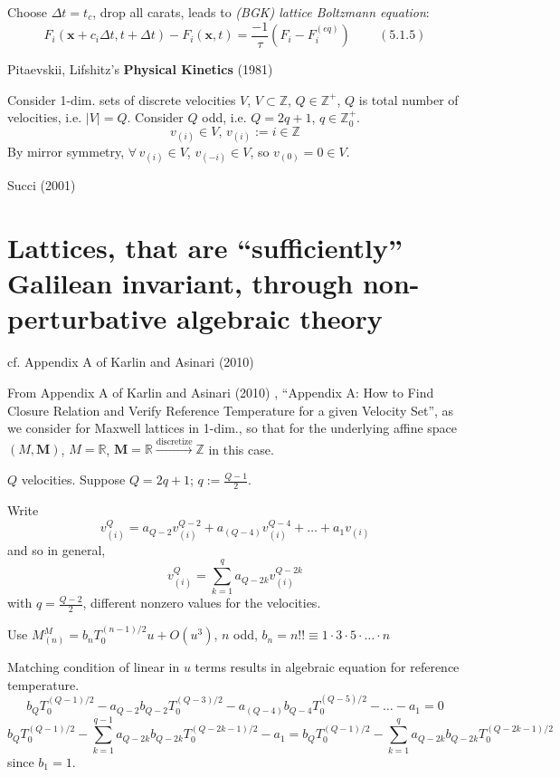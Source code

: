 \documentclass[twoside,landscape,10pt]{amsart}
\theoremstyle{plain}
\theoremstyle{definition}
\theoremstyle{remark}
\theoremstyle{remark}
\begin{document}
\begin{multicols*}{2}
Choose $\Delta t = t_c$, drop all carats, leads to \emph{(BGK) lattice Boltzmann equation}:
\begin{equation}
  F_i(\mathbf{x}+c_i\Delta t, t+\Delta t) - F_i(\mathbf{x},t) = \frac{-1}{\tau} (F_i - F_i^{(eq)} ) \qquad \, (5.1.5)
  \end{equation}

Pitaevskii, Lifshitz's \textbf{Physical Kinetics} (1981) \cite{PL1981}


Consider 1-dim. sets of discrete velocities $V$, $V\subset \mathbb{Z}$, $Q\in \mathbb{Z}^+$, $Q$ is total number of velocities, i.e. $|V|=Q$.  Consider $Q$ odd, i.e. $Q=2q+1$, $q\in \mathbb{Z}^+_0$.
\[
v_{(i)}\in V, \, v_{(i)} := i \in \mathbb{Z}
\]
By mirror symmetry, $\forall \, v_{(i)} \in V$, $v_{(-i)} \in V$, so $v_{(0)} =0\in V$.  




Succi (2001) \cite{Succ2001}


\section{Lattices, that are ``sufficiently'' Galilean invariant, through non-perturbative algebraic theory}



cf. Appendix A of Karlin and Asinari (2010) \cite{KaAs2010}

From Appendix A of Karlin and Asinari (2010) \cite{KaAs2010}, ``Appendix A: How to Find Closure Relation and Verify Reference Temperature for a given Velocity Set'', as we consider for Maxwell lattices in 1-dim., so that for the underlying affine space $(M,\mathbf{M})$, $M=\mathbb{R}$, $\mathbf{M}=\mathbb{R} \xrightarrow{\text{discretize}} \mathbb{Z}$ in this case.

$Q$ velocities.  Suppose $Q = 2q+1$; $q:= \frac{Q-1}{2}$.

Write
\[
v^Q_{(i)} = a_{Q-2}v_{(i)}^{Q-2} + a_{(Q-4)}v_{(i)}^{Q-4} + \dots + a_1 v_{(i)}
\]
and so in general,
\begin{equation}
  v_{(i)}^Q = \sum_{k=1}^q a_{Q-2k} v_{(i)}^{Q-2k}
\end{equation}
with $q = \frac{Q-2}{2}$, different nonzero values for the velocities.

Use $M_{(n)}^M = b_nT_0^{(n-1)/2} u + O(u^3)$, $n$ odd, $b_n=n!! \equiv 1\cdot 3 \cdot 5 \cdot \dots \cdot n$

Matching condition of linear in $u$ terms results in algebraic equation for reference temperature.
\[
b_QT_0^{(Q-1)/2} - a_{Q-2}b_{Q-2} T_0^{(Q-3)/2} - a_{(Q-4)} b_{Q-4} T_0^{(Q-5)/2} - \dots - a_1 = 0
\]
\begin{equation}
  b_QT_0^{(Q-1)/2} - \sum_{k=1}^{q-1} a_{Q-2k} b_{Q-2k} T_0^{(Q-2k-1)/2} - a_1 = b_Q T_0^{(Q-1)/2} - \sum_{k=1}^q a_{Q-2k} b_{Q-2k} T_0^{(Q-2k-1)/2} 
\end{equation}
since $b_1=1$.


\end{multicols*}
\end{document}
